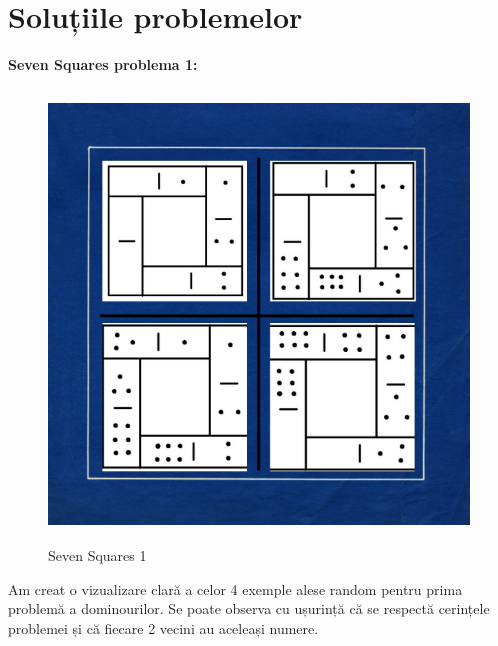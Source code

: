 \section{Soluțiile problemelor}
\textbf{Seven Squares problema 1:}\newline\newline

\inputminted[linenos]{python}{code/ss1.out}

\newline
\begin{figure}[h]
    \centering
    \includegraphics[width=12cm]{text/images/pic5.png}\\
    \caption{Seven Squares 1}
\end{figure} 
\newline\pagebreak

Am creat o vizualizare clară a celor 4 exemple alese random pentru prima problemă a dominourilor.
Se poate observa cu ușurință că se respectă cerințele problemei și că fiecare 2 vecini au aceleași numere.\pagebreak

